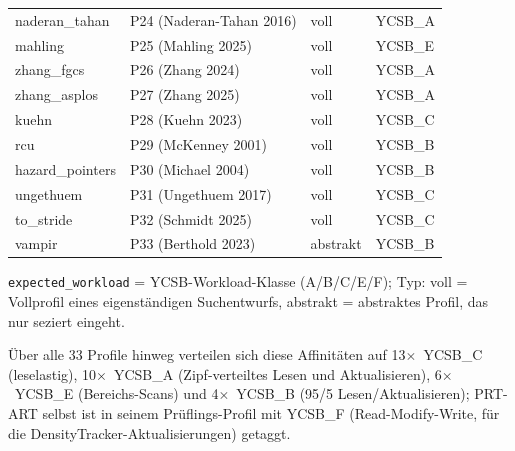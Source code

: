 \begin{nurlang}
\begin{table}[!htbp]
\begin{tabular}{llll}
    naderan\_tahan & P24 (Naderan-Tahan 2016) & voll & YCSB\_A \\
    mahling & P25 (Mahling 2025) & voll & YCSB\_E \\
    zhang\_fgcs & P26 (Zhang 2024) & voll & YCSB\_A \\
    zhang\_asplos & P27 (Zhang 2025) & voll & YCSB\_A \\
    kuehn & P28 (Kuehn 2023) & voll & YCSB\_C \\
    rcu & P29 (McKenney 2001) & voll & YCSB\_B \\
    hazard\_pointers & P30 (Michael 2004) & voll & YCSB\_B \\
    ungethuem & P31 (Ungethuem 2017) & voll & YCSB\_C \\
    to\_stride & P32 (Schmidt 2025) & voll & YCSB\_C \\
    vampir & P33 (Berthold 2023) & abstrakt & YCSB\_B \\
    \bottomrule
  \end{tabular}

  \smallskip
  {\footnotesize \texttt{expected\_workload} = YCSB-Workload-Klasse (A/B/C/E/F); Typ: voll = Vollprofil eines
  eigenständigen Suchentwurfs, abstrakt = abstraktes Profil, das nur seziert eingeht.\par}
\end{table}
\end{nurlang}

Über alle 33 Profile hinweg verteilen sich diese Affinitäten auf 13$\times$~YCSB\_C (leselastig),
10$\times$~YCSB\_A (Zipf-verteiltes Lesen und Aktualisieren), 6$\times$~YCSB\_E (Bereichs-Scans) und
4$\times$~YCSB\_B (95/5 Lesen/Aktualisieren); PRT-ART selbst ist in seinem Prüflings-Profil mit YCSB\_F
(Read-Modify-Write, für die DensityTracker-Aktualisierungen) getaggt.

